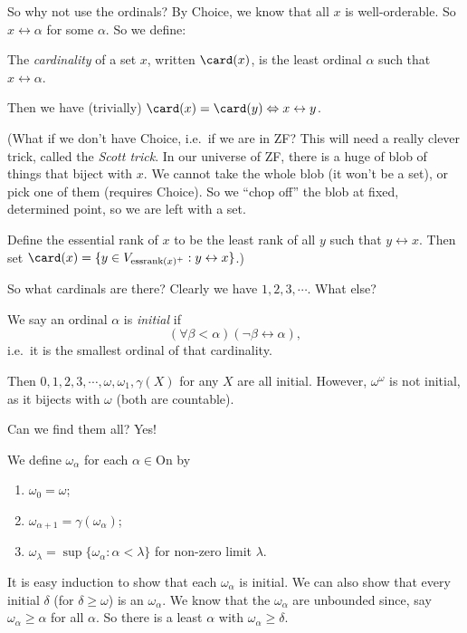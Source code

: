 \documentclass[a4paper]{article}
\begin{document}
So why not use the ordinals? By Choice, we know that all $x$ is well-orderable. So $x\leftrightarrow \alpha$ for some $\alpha$. So we define:
\begin{defi}[Cardinality]
  The \emph{cardinality} of a set $x$, written $\card(x)$, is the least ordinal $\alpha$ such that $x\leftrightarrow \alpha$.
\end{defi}
Then we have (trivially) $\card(x) = \card(y) \Leftrightarrow x\leftrightarrow y$.

(What if we don't have Choice, i.e.\ if we are in ZF? This will need a really clever trick, called the \emph{Scott trick}. In our universe of ZF, there is a huge of blob of things that biject with $x$. We cannot take the whole blob (it won't be a set), or pick one of them (requires Choice). So we ``chop off'' the blob at fixed, determined point, so we are left with a set.

Define the essential rank of $x$ to be the least rank of all $y$ such that $y\leftrightarrow x$. Then set $\card (x) = \{y\in V_{\mathrm{essrank}(x)^+}: y\leftrightarrow x\}$.)

So what cardinals are there? Clearly we have $1, 2, 3, \cdots$. What else?

\begin{defi}
  We say an ordinal $\alpha$ is \emph{initial} if
  \[
    (\forall \beta < \alpha)(\neg \beta \leftrightarrow \alpha),
  \]
  i.e.\ it is the smallest ordinal of that cardinality.
\end{defi}

Then $0, 1, 2, 3, \cdots, \omega, \omega_1, \gamma(X)$ for any $X$ are all initial. However, $\omega^\omega$ is not initial, as it bijects with $\omega$ (both are countable).

Can we find them all? Yes!
\begin{defi}\index{$\omega_\alpha$}
  We define $\omega_\alpha$ for each $\alpha \in \mathrm{On}$ by
  \begin{enumerate}
    \item $\omega_0 = \omega$;
    \item $\omega_{\alpha + 1} = \gamma(\omega_\alpha)$;
    \item $\omega_\lambda = \sup\{\omega_\alpha: \alpha < \lambda\}$ for non-zero limit $\lambda$.
  \end{enumerate}
\end{defi}
It is easy induction to show that each $\omega_\alpha$ is initial. We can also show that every initial $\delta$ (for $\delta \geq \omega$) is an $\omega_\alpha$. We know that the $\omega_\alpha$ are unbounded since, say $\omega_\alpha \geq \alpha$ for all $\alpha$. So there is a least $\alpha$ with $\omega_\alpha \geq \delta$.
\end{document}
